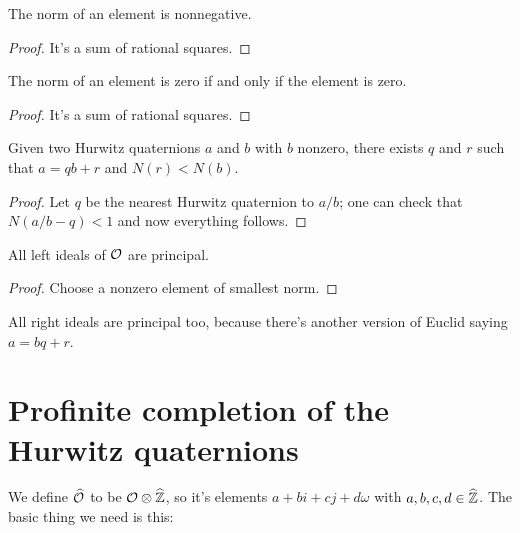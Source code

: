 \begin{lemma}
    \label{Hurwitz.norm_nonneg}
    \leanok
    The norm of an element is nonnegative.
\end{lemma}
\begin{proof} It's a sum of rational squares.
\end{proof}

\begin{lemma}
    \label{Hurwitz.norm_eq_zero}
    \leanok
    The norm of an element is zero if and only if the element is zero.
\end{lemma}
\begin{proof} It's a sum of rational squares.
\end{proof}

\begin{lemma}
    \label{Hurwitz.quot_rem}
    \leanok
    Given two Hurwitz quaternions $a$ and $b$ with $b$ nonzero, there exists
    $q$ and $r$ such that $a=qb+r$ and $N(r)<N(b)$.
\end{lemma}
\begin{proof}
  Let $q$ be the nearest Hurwitz quaternion to $a/b$; one can check that $N(a/b-q)<1$ and now
  everything follows.
\end{proof}

\begin{corollary}
    \label{Hurwitz.left_ideal_princ}
    \leanok
    All left ideals of $\mathcal{O}$ are principal.
\end{corollary}
\begin{proof}
     Choose a nonzero element of smallest norm.
\end{proof}

\begin{remark}
    All right ideals are principal too, because there's
    another version of Euclid saying $a=bq+r$.
\end{remark}

\section{Profinite completion of the Hurwitz quaternions}

We define $\widehat{\mathcal{O}}$ to be $\mathcal{O}\otimes\widehat{\mathbb{Z}}$, so it's elements $a+bi+cj+d\omega$
with $a,b,c,d\in\widehat{\mathbb{Z}}$. The basic thing we need is this:

